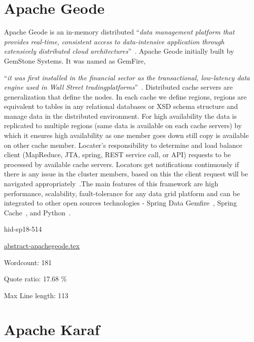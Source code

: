 \section{Apache Geode}

Apache Geode is an in-memory distributed \color{blue}``\emph{data management platform
that provides real-time, consistent access to data-intensive
application through extensively distributed cloud
architectures}''\color{black}~\cite{hid-sp18-514-apachegeodewiki}. Apache Geode
initially built by GemStone Systems. It was named as GemFire, 

\color{blue}``\emph{it was
first installed in the financial sector as the transactional,
low-latency data engine used in Wall Street tradingplatforms}''\color{black}~\cite{hid-sp18-514-apachegeodewiki}.
Distributed cache servers are generalization that define the nodes. In
each cache we define regions, regions are equivalent to tables in any
relational databases or XSD schema structure and manage data in the
distributed environment. For high availability the data is replicated
to multiple regions (same data is available on each cache servers) by
which it ensures high availability as one member goes down still copy
is available on other cache member. Locater's responsibility to
determine and load balance client (MapReduce, JTA, spring, REST service
call, or API) requests to be processed by available cache servers.
Locators get notifications continuously if there is any issue in the
cluster members, based on this the client request will be navigated
appropriately~\cite{hid-sp18-514-apachegeodewiki}.The main features of
this framework are high performance, scalability, fault-tolerance for
any data grid platform and can be integrated to other open sources
technologies - Spring Data
Gemfire~\cite{hid-sp18-514-geodespringgemfire}, Spring
Cache~\cite{hid-sp18-514-geodespringcache}, and
Python~\cite{hid-sp18-514-geodepython}.


\begin{IU}

hid-sp18-514

\href{https://github.com/cloudmesh-community/hid-sp18-514/blob/master//technology/abstract-apachegeode.tex}{abstract-apachegeode.tex}

 

Wordcount: 181


Quote ratio: 17.68 \%
 
Max Line length: 113
\end{IU}

\section{Apache Karaf}

